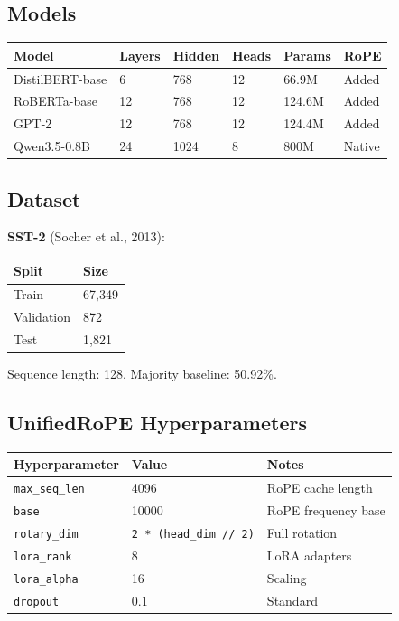 {\subsection{Models}

\begin{table}[H]
\centering
\small
\begin{tabular}{llllll}
\toprule
\textbf{Model} & \textbf{Layers} & \textbf{Hidden} & \textbf{Heads} & \textbf{Params} & \textbf{RoPE} \\
\midrule
DistilBERT-base & 6 & 768 & 12 & 66.9M & Added \\
RoBERTa-base & 12 & 768 & 12 & 124.6M & Added \\
GPT-2 & 12 & 768 & 12 & 124.4M & Added \\
Qwen3.5-0.8B & 24 & 1024 & 8 & 800M & Native \\
\bottomrule
\end{tabular}
\end{table}

\subsection{Dataset}

\textbf{SST-2} (Socher et al., 2013):

\begin{table}[H]
\centering
\small
\begin{tabular}{ll}
\toprule
\textbf{Split} & \textbf{Size} \\
\midrule
Train & 67,349 \\
Validation & 872 \\
Test & 1,821 \\
\bottomrule
\end{tabular}
\end{table}

Sequence length: 128. Majority baseline: 50.92\%.

\subsection{UnifiedRoPE Hyperparameters}

\begin{table}[H]
\centering
\small
\begin{tabular}{lll}
\toprule
\textbf{Hyperparameter} & \textbf{Value} & \textbf{Notes} \\
\midrule
\texttt{max\_seq\_len} & 4096 & RoPE cache length \\
\texttt{base} & 10000 & RoPE frequency base \\
\texttt{rotary\_dim} & \texttt{2 * (head\_dim // 2)} & Full rotation \\
\texttt{lora\_rank} & 8 & LoRA adapters \\
\texttt{lora\_alpha} & 16 & Scaling \\
\texttt{dropout} & 0.1 & Standard \\
\bottomrule
\end{tabular}
\end{table}

}
